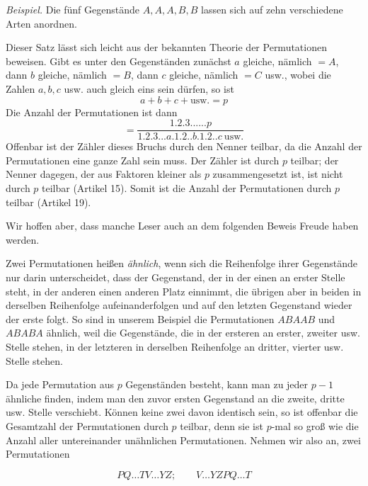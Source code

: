 \emph{Beispiel.} Die fünf Gegenstände $A,A,A,B,B$ lassen sich auf zehn verschiedene Arten anordnen.

Dieser Satz lässt sich leicht aus der bekannten Theorie der Permutationen beweisen. Gibt es unter den Gegenständen zunächst $a$ gleiche, nämlich $=A$, dann $b$ gleiche, nämlich $=B$, dann $c$ gleiche, nämlich $=C$ usw., wobei die Zahlen $a,b,c$ usw. auch gleich eins sein dürfen, so ist
\[a+b+c+\mathrm{usw.}=p\]
Die Anzahl der Permutationen ist dann
\[=\frac{1.2.3......p}{1.2.3...a.1.2..b.1.2..c\ \mathrm{usw.}}\]
Offenbar ist der Zähler dieses Bruchs durch den Nenner teilbar, da die Anzahl der Permutationen eine ganze Zahl sein muss. Der Zähler ist durch $p$ teilbar; der Nenner dagegen, der aus Faktoren kleiner als $p$ zusammengesetzt ist, ist nicht durch $p$ teilbar (Artikel 15). Somit ist die Anzahl der Permutationen durch $p$ teilbar (Artikel 19).

Wir hoffen aber, dass manche Leser auch an dem folgenden Beweis Freude haben werden.

Zwei Permutationen heißen \emph{ähnlich}, wenn sich die Reihenfolge ihrer Gegenstände nur darin unterscheidet, dass der Gegenstand, der in der einen an erster Stelle steht, in der anderen einen anderen Platz einnimmt, die übrigen aber in beiden in derselben Reihenfolge aufeinanderfolgen und auf den letzten Gegenstand wieder der erste folgt. So sind in unserem Beispiel die Permutationen $ABAAB$ und $ABABA$ ähnlich, weil die Gegenstände, die in der ersteren an erster, zweiter usw. Stelle stehen, in der letzteren in derselben Reihenfolge an dritter, vierter usw. Stelle stehen.


Da jede Permutation aus $p$ Gegenständen besteht, kann man zu jeder $p-1$ ähnliche finden, indem man den zuvor ersten Gegenstand an die zweite, dritte usw. Stelle verschiebt. Können keine zwei davon identisch sein, so ist offenbar die Gesamtzahl der Permutationen durch $p$ teilbar, denn sie ist $p$-mal so groß wie die Anzahl aller untereinander unähnlichen Permutationen. Nehmen wir also an, zwei Permutationen

\[PQ\ldots TV\ldots YZ;\qquad V\ldots YZPQ\ldots T\]


